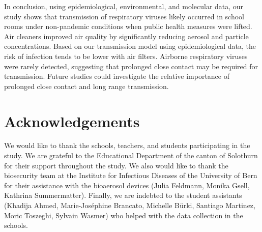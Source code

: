 \documentclass[fleqn,11pt]{wlscirep}
\begin{document}
In conclusion, using epidemiological, environmental, and molecular data, our study shows that transmission of respiratory viruses likely occurred in school rooms under non-pandemic conditions when public health measures were lifted. Air cleaners improved air quality by significantly reducing aerosol and particle concentrations. Based on our transmission model using epidemiological data, the risk of infection tends to be lower with air filters. Airborne respiratory viruses were rarely detected, suggesting that prolonged close contact may be required for transmission. Future studies could investigate the relative importance of prolonged close contact and long range transmission.


\newpage


\section*{Acknowledgements}
We would like to thank the schools, teachers, and students participating in the study. We are grateful to the Educational Department of the canton of Solothurn for their support throughout the study. We also would like to thank the biosecurity team at the Institute for Infectious Diseases of the University of Bern for their assistance with the bioaerosol devices (Julia Feldmann, Monika Gsell, Kathrina Summermatter). Finally, we are indebted to the student assistants (Khadija Ahmed, Marie-Joséphine Brancato, Michelle Bürki, Santiago Martinez, Moric Toszeghi, Sylvain Wasmer) who helped with the data collection in the schools.


\end{document}
